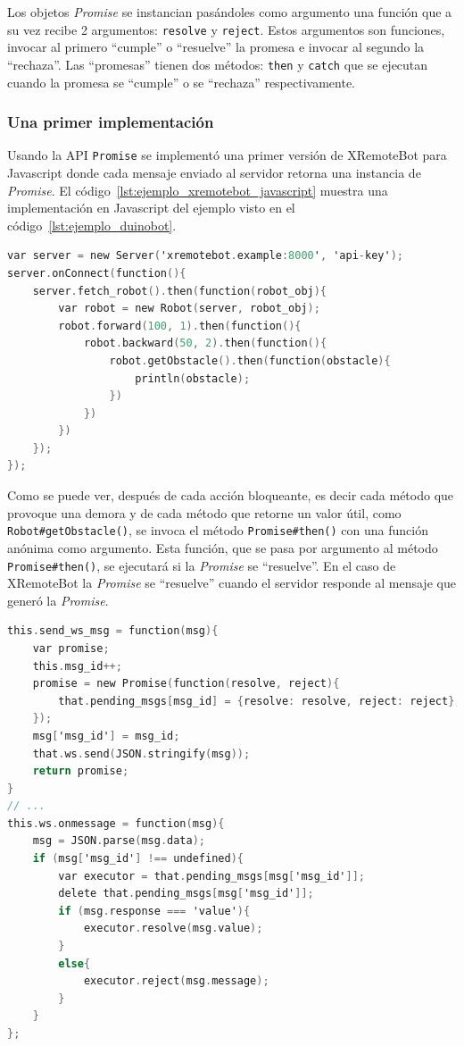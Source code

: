 Los objetos \textit{Promise} se instancian pasándoles como argumento una
función que a su vez recibe 2 argumentos: \texttt{resolve} y \texttt{reject}.
Estos argumentos son funciones, invocar al primero
``cumple'' o ``resuelve'' la promesa e invocar al segundo la
``rechaza''.
Las ``promesas'' tienen dos métodos: \texttt{then} y \texttt{catch} que se
ejecutan cuando la promesa se ``cumple'' o se ``rechaza'' respectivamente.

\subsubsection{Una primer implementación}
Usando la API \texttt{Promise} se implementó una primer versión de XRemoteBot
para Javascript
donde cada mensaje enviado al servidor retorna una instancia de \textit{Promise}.
El código~\ref{lst:ejemplo_xremotebot_javascript} muestra una implementación
en Javascript del ejemplo visto en el código~\ref{lst:ejemplo_duinobot}.

\begin{lstlisting}[language=C,
caption={Ejemplo de XRemoteBot en Javascript},
label=lst:ejemplo_xremotebot_javascript]
var server = new Server('xremotebot.example:8000', 'api-key');
server.onConnect(function(){
    server.fetch_robot().then(function(robot_obj){
        var robot = new Robot(server, robot_obj);
        robot.forward(100, 1).then(function(){
            robot.backward(50, 2).then(function(){
                robot.getObstacle().then(function(obstacle){
                    println(obstacle);
                })
            })
        })
    });
});
\end{lstlisting}

Como se puede ver, después de cada acción bloqueante, es decir cada método que
provoque una demora y de cada método que retorne un valor útil, como
\texttt{Robot\#getObstacle()}, se invoca el método \texttt{Promise\#then()} con
una función anónima como argumento. Esta función, que se pasa por argumento al
método \texttt{Promise\#then()}, se ejecutará si la \textit{Promise} se
``resuelve''. En el caso de
XRemoteBot la \textit{Promise} se ``resuelve'' cuando el servidor
responde al mensaje que generó la \textit{Promise}.

\begin{lstlisting}[language=C,
caption={Ejemplo simplificado de la implementación de XRemoteBot con
Promises dentro del constructor Server en xremotebot.js},
label=lst:ejemplo_xremotebot_javascript_promises]
this.send_ws_msg = function(msg){
    var promise;
    this.msg_id++;
    promise = new Promise(function(resolve, reject){
        that.pending_msgs[msg_id] = {resolve: resolve, reject: reject};
    });
    msg['msg_id'] = msg_id;
    that.ws.send(JSON.stringify(msg));
    return promise;
}
// ...
this.ws.onmessage = function(msg){
    msg = JSON.parse(msg.data);
    if (msg['msg_id'] !== undefined){
        var executor = that.pending_msgs[msg['msg_id']];
        delete that.pending_msgs[msg['msg_id']];
        if (msg.response === 'value'){
            executor.resolve(msg.value);
        }
        else{
            executor.reject(msg.message);
        }
    }
};
\end{lstlisting}

